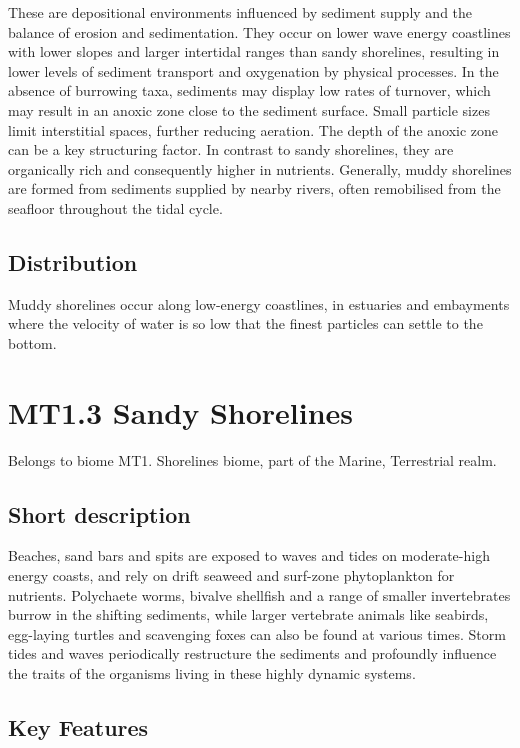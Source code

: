 \documentclass[
  letterpaper,
  DIV=11,
  numbers=noendperiod]{scrartcl}
\begin{document}
These are depositional environments influenced by sediment supply and
the balance of erosion and sedimentation. They occur on lower wave
energy coastlines with lower slopes and larger intertidal ranges than
sandy shorelines, resulting in lower levels of sediment transport and
oxygenation by physical processes. In the absence of burrowing taxa,
sediments may display low rates of turnover, which may result in an
anoxic zone close to the sediment surface. Small particle sizes limit
interstitial spaces, further reducing aeration. The depth of the anoxic
zone can be a key structuring factor. In contrast to sandy shorelines,
they are organically rich and consequently higher in nutrients.
Generally, muddy shorelines are formed from sediments supplied by nearby
rivers, often remobilised from the seafloor throughout the tidal cycle.

\subsection{Distribution}\label{distribution-53}

Muddy shorelines occur along low-energy coastlines, in estuaries and
embayments where the velocity of water is so low that the finest
particles can settle to the bottom.

\section{MT1.3 Sandy Shorelines}\label{mt1.3-sandy-shorelines}

Belongs to biome MT1. Shorelines biome, part of the Marine, Terrestrial
realm.

\subsection{Short description}\label{short-description-54}

Beaches, sand bars and spits are exposed to waves and tides on
moderate-high energy coasts, and rely on drift seaweed and surf-zone
phytoplankton for nutrients. Polychaete worms, bivalve shellfish and a
range of smaller invertebrates burrow in the shifting sediments, while
larger vertebrate animals like seabirds, egg-laying turtles and
scavenging foxes can also be found at various times. Storm tides and
waves periodically restructure the sediments and profoundly influence
the traits of the organisms living in these highly dynamic systems.

\subsection{Key Features}\label{key-features-54}
\end{document}
